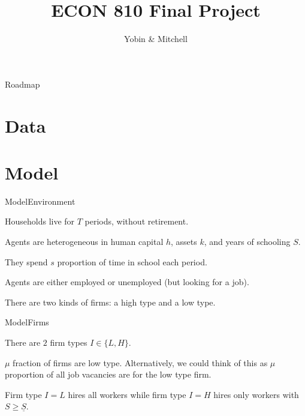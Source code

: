 \documentclass[notes, 10pt,t]{beamer}
\title{ECON 810 Final Project}
\date{\displaydate{duedate}}
\author{Yobin  \& Mitchell}
\newenvironment{wideitemize}{\itemize\addtolength{\itemsep}{10pt}}{\enditemize}
\begin{document}
	\begin{frame}
		\maketitle
	\end{frame}

	\begin{frame}{Roadmap}
		\tableofcontents
	\end{frame}
	
	\section{Data}
	\begin{frame}
		
	\end{frame}
	\section{Model}
	\begin{frame}{Model}{Environment}
		\begin{wideitemize}
			\item Households live for $ T $ periods, without retirement. 
			\item Agents are heterogeneous in human capital $ h $, assets $ k $, and years of schooling $S$. 
			\item They spend $ s $ proportion of time in school each period.
			\item Agents are either employed or unemployed (but looking for a job).
			\item There are two kinds of firms: a high type and a low type.
		\end{wideitemize}
	\end{frame}

	\begin{frame}{Model}{Firms}
		\begin{wideitemize}
			\item There are $2$ firm types $I \in \{L,H\}$.
			\item $ \mu $ fraction of firms are low type. Alternatively, we could think of this as $\mu$ proportion of all job vacancies are for the low type firm.
			\item Firm type $I=L$ hires all workers while firm type $I=H$ hires only workers with $S \geq \underline{S}$.
		\end{wideitemize}
	\end{frame}
\end{document}
